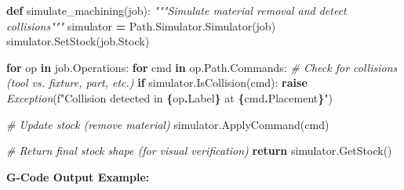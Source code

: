 \documentclass[
]{article}
\newenvironment{Shaded}{\begin{snugshade}}{\end{snugshade}}
\newcommand{\CommentTok}[1]{\textcolor[rgb]{0.56,0.35,0.01}{\textit{#1}}}
\newcommand{\ControlFlowTok}[1]{\textcolor[rgb]{0.13,0.29,0.53}{\textbf{#1}}}
\newcommand{\KeywordTok}[1]{\textcolor[rgb]{0.13,0.29,0.53}{\textbf{#1}}}
\newcommand{\NormalTok}[1]{#1}
\newcommand{\OperatorTok}[1]{\textcolor[rgb]{0.81,0.36,0.00}{\textbf{#1}}}
\newcommand{\PreprocessorTok}[1]{\textcolor[rgb]{0.56,0.35,0.01}{\textit{#1}}}
\newcommand{\SpecialCharTok}[1]{\textcolor[rgb]{0.81,0.36,0.00}{\textbf{#1}}}
\newcommand{\SpecialStringTok}[1]{\textcolor[rgb]{0.31,0.60,0.02}{#1}}
\begin{document}
\begin{Shaded}
\begin{Highlighting}[]
\KeywordTok{def}\NormalTok{ simulate\_machining(job):}
    \CommentTok{"""Simulate material removal and detect collisions"""}
\NormalTok{    simulator }\OperatorTok{=}\NormalTok{ Path.Simulator.Simulator(job)}
\NormalTok{    simulator.SetStock(job.Stock)}

    \ControlFlowTok{for}\NormalTok{ op }\KeywordTok{in}\NormalTok{ job.Operations:}
        \ControlFlowTok{for}\NormalTok{ cmd }\KeywordTok{in}\NormalTok{ op.Path.Commands:}
            \CommentTok{\# Check for collisions (tool vs. fixture, part, etc.)}
            \ControlFlowTok{if}\NormalTok{ simulator.IsCollision(cmd):}
                \ControlFlowTok{raise} \PreprocessorTok{Exception}\NormalTok{(}\SpecialStringTok{f"Collision detected in }\SpecialCharTok{\{}\NormalTok{op}\SpecialCharTok{.}\NormalTok{Label}\SpecialCharTok{\}}\SpecialStringTok{ at }\SpecialCharTok{\{}\NormalTok{cmd}\SpecialCharTok{.}\NormalTok{Placement}\SpecialCharTok{\}}\SpecialStringTok{"}\NormalTok{)}

            \CommentTok{\# Update stock (remove material)}
\NormalTok{            simulator.ApplyCommand(cmd)}

    \CommentTok{\# Return final stock shape (for visual verification)}
    \ControlFlowTok{return}\NormalTok{ simulator.GetStock()}
\end{Highlighting}
\end{Shaded}

\textbf{G-Code Output Example:}
\end{document}
